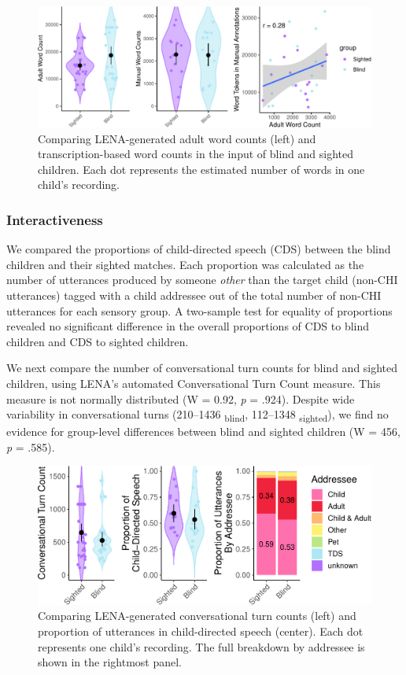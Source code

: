 \documentclass[
  man,floatsintext]{apa6}
\begin{document}
\begin{figure}
\centering
\includegraphics{input_quality_manuscript_files/figure-latex/quantity-plots-1.pdf}
\caption{\label{fig:quantity-plots}Comparing LENA-generated adult word counts (left) and transcription-based word counts in the input of blind and sighted children. Each dot represents the estimated number of words in one child's recording.}
\end{figure}

\hypertarget{interactiveness}{%
\subsubsection{Interactiveness}\label{interactiveness}}

We compared the proportions of child-directed speech (CDS) between the blind children and their sighted matches. Each proportion was calculated as the number of utterances produced by someone \emph{other} than the target child (non-CHI utterances) tagged with a child addressee out of the total number of non-CHI utterances for each sensory group. A two-sample test for equality of proportions revealed no significant difference in the overall proportions of CDS to blind children and CDS to sighted children.

We next compare the number of conversational turn counts for blind and sighted children, using LENA's automated Conversational Turn Count measure. This measure is not normally distributed (W = 0.92, \emph{p} = .924). Despite wide variability in conversational turns (210--1436 \textsubscript{blind}, 112--1348 \textsubscript{sighted}), we find no evidence for group-level differences between blind and sighted children (W = 456, \emph{p} = .585).

\begin{figure}
\centering
\includegraphics{input_quality_manuscript_files/figure-latex/interactiveness-plots-1.pdf}
\caption{\label{fig:interactiveness-plots}Comparing LENA-generated conversational turn counts (left) and proportion of utterances in child-directed speech (center). Each dot represents one child's recording. The full breakdown by addressee is shown in the rightmost panel.}
\end{figure}
\end{document}
